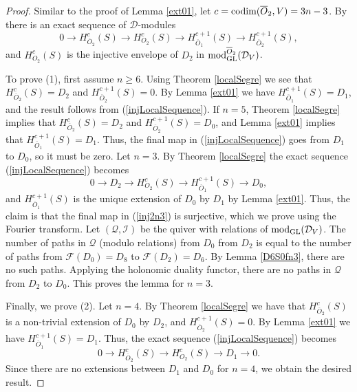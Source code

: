 \documentclass[11pt,reqno]{amsart}
\newcommand{\D}{\mathcal{D}}
\newcommand{\tn}{\textnormal}
\newcommand{\mc}[1]{\mathcal{#1}}
\numberwithin{equation}{section}
\begin{document}
\begin{proof}
Similar to the proof of Lemma \ref{ext01}, let $c=\tn{codim}(\overline{O}_2,V)=3n-3$. By \cite[Lemma 3.11]{lHorincz2019categories} there is an exact sequence of $\D$-modules
\begin{equation}\label{injLocalSequence}
0\longrightarrow H^c_{\overline{O}_2}(S)\longrightarrow H^c_{O_2}(S)\longrightarrow H^{c+1}_{\overline{O}_1}(S)\longrightarrow H^{c+1}_{\overline{O}_2}(S),
\end{equation}
and $H^c_{O_2}(S)$ is the injective envelope of $D_2$ in $\tn{mod}_{\tn{GL}}^{\overline{O}_2}(\D_V)$.

To prove (1), first assume $n\geq 6$. Using Theorem \ref{localSegre} we see that $H^c_{\overline{O}_2}(S)=D_2$ and $H^{c+1}_{\overline{O}_2}(S)=0$. By Lemma \ref{ext01} we have $H^{c+1}_{\overline{O}_1}(S)=D_1$, and the result follows from (\ref{injLocalSequence}). If $n=5$, Theorem \ref{localSegre} implies that $H^c_{\overline{O}_2}(S)=D_2$ and $H^{c+1}_{\overline{O}_2}(S)=D_0$, and Lemma \ref{ext01} implies that $H^{c+1}_{\overline{O}_1}(S)=D_1$. Thus, the final map in (\ref{injLocalSequence}) goes from $D_1$ to $D_0$, so it must be zero. Let $n=3$. By Theorem \ref{localSegre} the exact sequence (\ref{injLocalSequence}) becomes
\begin{equation}\label{inj2n3}
0\longrightarrow D_2\longrightarrow H^c_{O_2}(S)\longrightarrow H^{c+1}_{\overline{O}_1}(S)\longrightarrow D_0,
\end{equation}
and $H^{c+1}_{\overline{O}_1}(S)$ is the unique extension of $D_0$ by $D_1$ by Lemma \ref{ext01}. Thus, the claim is that the final map in (\ref{inj2n3}) is surjective, which we prove using the Fourier transform. Let $(\mc{Q},\mc{I})$ be the quiver with relations of $\tn{mod}_{\tn{GL}}(\D_V)$. The number of paths in $\mc{Q}$ (modulo relations) from $D_0$ from $D_2$ is equal to the number of paths from $\mc{F}(D_0)=D_8$ to $\mc{F}(D_2)=D_6$. By Lemma \ref{D6S0fn3}, there are no such paths. Applying the holonomic duality functor, there are no paths in $\mc{Q}$ from $D_2$ to $D_0$. This proves the lemma for $n=3$.

Finally, we prove (2). Let $n=4$. By Theorem \ref{localSegre} we have that $H^c_{\overline{O}_2}(S)$ is a non-trivial extension of $D_0$ by $D_2$, and $H^{c+1}_{\overline{O}_2}(S)=0$. By Lemma \ref{ext01} we have $H^{c+1}_{\overline{O}_1}(S)=D_1$. Thus, the exact sequence (\ref{injLocalSequence}) becomes
$$
0\longrightarrow H^c_{\overline{O}_2}(S)\longrightarrow H^c_{O_2}(S)\longrightarrow D_1\longrightarrow 0.
$$
Since there are no extensions between $D_1$ and $D_0$ for $n=4$, we obtain the desired result.
\end{proof}
\end{document}
